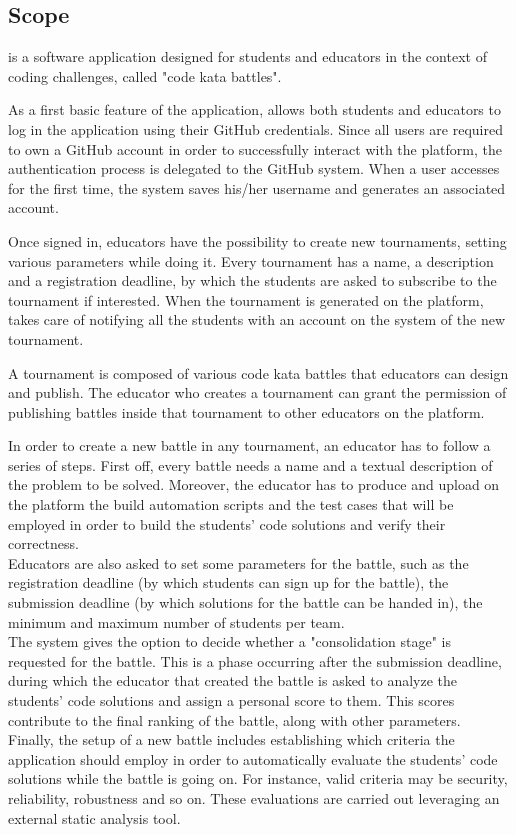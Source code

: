\subsection{Scope}
	\app is a software application designed for students and educators in the context of coding challenges, called "code kata battles".
	
	As a first basic feature of the application, \app allows both students and educators to log in the application using their GitHub credentials. Since all users are required to own a GitHub account in order to successfully interact with the \app platform, the authentication process is delegated to the GitHub system. When a user accesses \app for the first time, the system saves his/her username and generates an associated \app account.
	
	Once signed in, educators have the possibility to create new tournaments, setting various parameters while doing it. Every tournament has a name, a description and a registration deadline, by which the students are asked to subscribe to the tournament if interested. When the tournament is generated on the platform, \app takes care of notifying all the students with an account on the system of the new tournament.
	
	A tournament is composed of various code kata battles that educators can design and publish. The educator who creates a tournament can grant the permission of publishing battles inside that tournament to other educators on the platform.
	
	In order to create a new battle in any tournament, an educator has to follow a series of steps. First off, every battle needs a name and a textual description of the problem to be solved. Moreover, the educator has to produce and upload on the platform the build automation scripts and the test cases that will be employed in order to build the students' code solutions and verify their correctness.\\
	Educators are also asked to set some parameters for the battle, such as the registration deadline (by which students can sign up for the battle), the submission deadline (by which solutions for the battle can be handed in), the minimum and maximum number of students per team.\\	
	The system gives the option to decide whether a "consolidation stage" is requested for the battle. This is a phase occurring after the submission deadline, during which the educator that created the battle is asked to analyze the students' code solutions and assign a personal score to them. This scores contribute to the final ranking of the battle, along with other parameters.\\
	Finally, the setup of a new battle includes establishing which criteria the application should employ in order to automatically evaluate the students' code solutions while the battle is going on. For instance, valid criteria may be security, reliability, robustness and so on. These evaluations are carried out leveraging an external static analysis tool.
	
